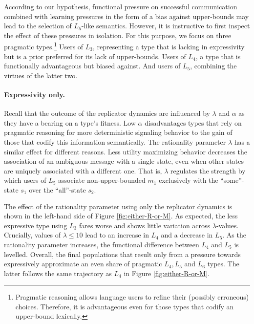 \documentclass[a4paper]{article}
\begin{document}
According to our hypothesis, functional pressure on successful communication combined with learning pressures in the form of a bias against upper-bounds may lead to the selection of $L_5$-like semantics. However, it is instructive to first inspect the effect of these pressures in isolation. For this purpose, we focus on three pragmatic types.\footnote{Pragmatic reasoning allows language users to refine their (possibly erroneous) choices. Therefore, it is advantageous even for those types that codify an upper-bound lexically.} Users of $L_3$, representing a type that is lacking in expressivity but is a prior preferred for its lack of upper-bounds. Users of $L_4$, a type that is functionally advantageous but biased against. And users of $L_5$, combining the virtues of the latter two.  

\paragraph{Expressivity only.} Recall that the outcome of the replicator dynamics are influenced by $\lambda$ and $\alpha$ as they have a bearing on a type's fitness. Low $\alpha$ disadvantages types that rely on pragmatic reasoning for more deterministic signaling behavior to the gain of those that codify this information semantically. The rationality parameter $\lambda$ has a similar effect for different reasons. Less utility maximizing behavior decreases the association of an ambiguous message with a single state, even when other states are uniquely associated with a different one. That is, $\lambda$ regulates the strength by which users of $L_5$ associate non-upper-bounded $m_1$ exclusively with the ``some''-state $s_1$ over the ``all''-state $s_2$. 

The effect of the rationality parameter using only the replicator dynamics is shown in the left-hand side of Figure \ref{fig:either-R-or-M}. As expected, the less expressive type using $L_3$ fares worse and shows little variation across $\lambda$-values. Crucially, values of $\lambda \leq 10$ lead to an increase in $L_4$ and a decrease in $L_5$. As the rationality parameter increases, the functional difference between $L_4$ and $L_5$ is levelled. Overall, the final populations that result only from a pressure towards expressively approximate an even share of pragmatic $L_4, L_5$ and $L_6$ types. The latter follows the same trajectory as $L_4$ in Figure \ref{fig:either-R-or-M}.  
\end{document}
